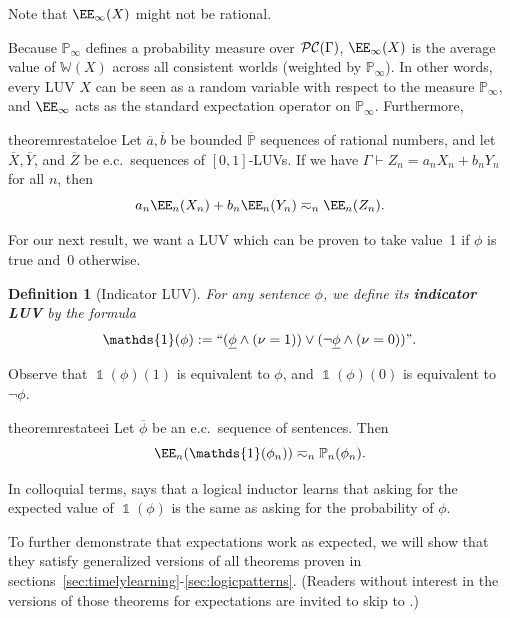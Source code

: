 \documentclass[authordate,onecolumn,noenvironments]{miri-tech-article}
\newtheorem{definition}[theorem]{Definition}
\numberwithin{equation}{subsection}
\newcommand{\quot}[1]{``#1"}
\newcommand{\enc}[1]{{\underline{#1}}}
\newcommand{\seq}[1]{{\overline{#1}}}
\newcommand{\nn}{n}
\newcommand{\phis}{\seq{\phi}}
\newcommand{\ec}[1][\ ]{e.c.#1}
\newcommand{\pgenable}{\ensuremath{\MP}\text{-generable}\xspace}
\newcommand{\rparenthetical}[1]{\hfill\upshape{{\small (#1)}}} %
\newcommand{\proofin}[1]{\rparenthetical{Proof in:~#1.}}
\newcommand{\BelState}{\mathbb{P}}
\newcommand{\pt}{\BelState}
\newcommand{\MP}{\seq{\pt}}
\newcommand{\cworlds}{\mathcal{P\-C}} %
\newcommand{\World}{\mathbb{W}}
\newcommand{\Theory}{\Gamma}
\DeclareMathOperator{\OneOperator}{\mathds{1}}
\begin{document}
Note that $\EE_\infty(X)$ might not be rational.

Because $\pt_\infty$ defines a probability measure over $\cworlds(\Theory)$, $\EE_\infty(X)$ is the average value of $\World(X)$ across all consistent worlds (weighted by $\pt_\infty$). In other words, every LUV $X$ can be seen as a random variable with respect to the measure $\pt_\infty$, and $\EE_\infty$ acts as the standard expectation operator on $\pt_\infty$. Furthermore,

\begin{restatable}{theorem}{restateloe}\label{thm:loe}
  Let $\seq a, \seq b$ be bounded \pgenable sequences of rational numbers, and let $\seq{X}, \seq{Y}$, and $\seq{Z}$ be \ec sequences of $[0,1]$-LUVs. If we have $\Theory \vdash{Z_\nn = a_\nn X_\nn + b_\nn Y_\nn}$ for all $\nn$, then
  \[
    a_\nn \EE_\nn(X_\nn) + b_\nn \EE_\nn(Y_\nn) \eqsim_\nn \EE_\nn(Z_\nn).
  \]
  \proofin{\ref{app:loe}}
\end{restatable}

For our next result, we want a LUV which can be proven to take value~1 if $\phi$ is true and~0 otherwise.

\begin{definition}[Indicator LUV]
  For any sentence $\phi$, we define its \textbf{indicator LUV} by the formula
  \[
    \OneOperator(\phi) := \quot{(\enc{\phi} \wedge (\nu = 1)) \vee (\lnot\enc{\phi} \wedge (\nu = 0))}.
  \]
\end{definition}

\noindent Observe that $\OneOperator(\phi)(1)$ is equivalent to $\phi$, and $\OneOperator(\phi)(0)$ is equivalent to $\lnot\phi$.

\begin{restatable}{theorem}{restateei}\label{thm:ei}
  Let $\phis$ be an \ec sequence of sentences. Then
  \[
    \EE_\nn(\OneOperator(\phi_\nn)) \eqsim_\nn \pt_\nn(\phi_\nn).
  \]
  \proofin{\ref{app:ei}}
\end{restatable}

\noindent In colloquial terms,  says that a logical inductor learns that asking for the expected value of $\OneOperator(\phi)$ is the same as asking for the probability of $\phi$.

To further demonstrate that expectations work as expected, we will show that they satisfy generalized versions of all theorems proven in sections~\ref{sec:timelylearning}-\ref{sec:logicpatterns}. (Readers without interest in the versions of those theorems for expectations are invited to skip to .)
\end{document}
